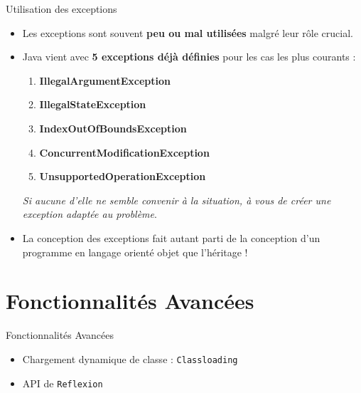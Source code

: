 \documentclass[handout]{beamer}
\begin{document}
\begin{frame}
	
\end{frame}

\begin{frame}
	\begin{block}{Utilisation des exceptions}
		\begin{itemize}
			\item Les exceptions sont souvent \textbf{peu ou mal utilisées} malgré leur rôle crucial.
			\item Java vient avec \textbf{5 exceptions déjà définies} pour les cas les plus courants :
				\begin{enumerate}
					\item \textbf{IllegalArgumentException} %
					\item \textbf{IllegalStateException} %
					\item \textbf{IndexOutOfBoundsException} %
					\item \textbf{ConcurrentModificationException} %
					\item \textbf{UnsupportedOperationException} %
				\end{enumerate}
				\textit{Si aucune d'elle ne semble convenir à la situation, à vous de créer une exception adaptée au problème}.
			\item La conception des exceptions fait autant parti de la conception d'un programme en langage orienté objet que l'héritage !
		\end{itemize}
	\end{block}
\end{frame}

\section{Fonctionnalités Avancées}
\begin{frame}
	\begin{block}{Fonctionnalités Avancées}
		\begin{itemize}
			\item Chargement dynamique de classe : \texttt{Classloading}
			\item API de \texttt{Reflexion}
		\end{itemize}
	\end{block}
\end{frame}
\end{document}
